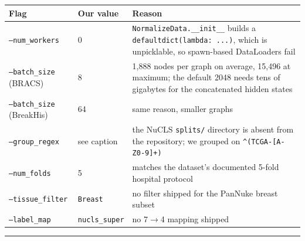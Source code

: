\documentclass[10pt,a4paper]{article}
\begin{document}
\begin{longtable}{@{}p{3.6cm}p{2.6cm}p{9.4cm}@{}}
\toprule
\textbf{Flag} & \textbf{Our value} & \textbf{Reason} \\
\midrule \endhead
\texttt{--num\_workers} & 0 & \texttt{NormalizeData.\_\_init\_\_} builds a \texttt{defaultdict(lambda: ...)}, which is unpicklable, so spawn-based DataLoaders fail \\
\texttt{--batch\_size} (BRACS) & 8 & 1{,}888 nodes per graph on average, 15{,}496 at maximum; the default 2048 needs tens of gigabytes for the concatenated hidden states \\
\texttt{--batch\_size} (BreakHis) & 64 & same reason, smaller graphs \\
\texttt{--group\_regex} & see caption & the NuCLS \texttt{splits/} directory is absent from the repository; we grouped on \texttt{\^{}(TCGA-[A-Z0-9]+)} \\
\texttt{--num\_folds} & 5 & matches the dataset's documented 5-fold hospital protocol \\
\texttt{--tissue\_filter} & \texttt{Breast} & no filter shipped for the PanNuke breast subset \\
\texttt{--label\_map} & \texttt{nucls\_super} & no 7$\rightarrow$4 mapping shipped \\
\bottomrule
\end{longtable}

\vspace{10pt}
\hrule
\vspace{6pt}
\end{document}
